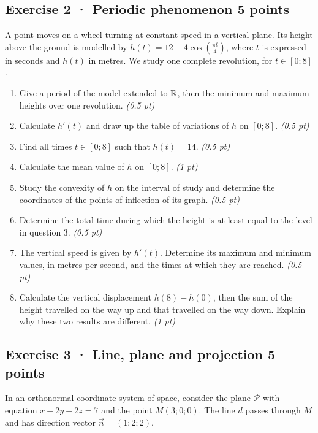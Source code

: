 \subsection*{Exercise 2 · Periodic phenomenon \hfill 5 points}A point moves on a wheel turning at constant speed in a vertical plane. Its height above the ground is modelled by $h(t)=12-4\cos\left(\frac{\pi t}{4}\right)$, where $t$ is expressed in seconds and $h(t)$ in metres. We study one complete revolution, for $t\in[0;8]$.

\begin{enumerate}

\item Give a period of the model extended to $\mathbb R$, then the minimum and maximum heights over one revolution. \hfill\textit{(0.5 pt)}

\item Calculate $h'(t)$ and draw up the table of variations of $h$ on $[0;8]$. \hfill\textit{(0.5 pt)}

\item Find all times $t\in[0;8]$ such that $h(t)=14$. \hfill\textit{(0.5 pt)}

\item Calculate the mean value of $h$ on $[0;8]$. \hfill\textit{(1 pt)}

\item Study the convexity of $h$ on the interval of study and determine the coordinates of the points of inflection of its graph. \hfill\textit{(0.5 pt)}

\item Determine the total time during which the height is at least equal to the level in question 3. \hfill\textit{(0.5 pt)}

\item The vertical speed is given by $h'(t)$. Determine its maximum and minimum values, in metres per second, and the times at which they are reached. \hfill\textit{(0.5 pt)}

\item Calculate the vertical displacement $h(8)-h(0)$, then the sum of the height travelled on the way up and that travelled on the way down. Explain why these two results are different. \hfill\textit{(1 pt)}

\end{enumerate}

\clearpage{}\par

\subsection*{Exercise 3 · Line, plane and projection \hfill 5 points}In an orthonormal coordinate system of space, consider the plane $\mathcal P$ with equation $x+2y+2z=7$ and the point $M(3;0;0)$. The line $d$ passes through $M$ and has direction vector $\vec n=(1;2;2)$.

